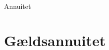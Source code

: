 \documentclass[12pt]{article}
\begin{document}




\begin{center}
	\Huge
	Annuitet
\end{center}




\section*{Gældsannuitet}
\end{document}
